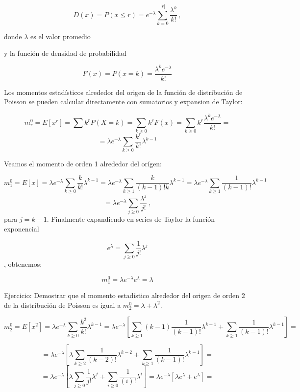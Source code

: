 \documentclass[
]{agujournal2019}
\begin{document}
\[D(x)=P(x \le r)=e^{-\lambda}\sum^{|r|}_{k=0}\frac{\lambda^k}{k!}\,,\]

donde \(\lambda\) es el valor promedio

\begin{center}
\end{center}

y la función de densidad de probabilidad

\[F(x)=P(x=k)=\frac{{\lambda}^k e^{-\lambda}}{k!}\]

\begin{center}
\end{center}

Los momentos estadísticos alrededor del origen de la función de
distribución de Poisson se pueden calcular directamente con sumatorios y
expansion de Taylor:

\[m^0_r=E[x^r]=\sum k^r P(X=k)=\sum_{k\ge0} k^rF(x)= \sum_{k\ge0} k^r\frac{{\lambda}^k e^{-\lambda}}{k!}=\]
\[=\lambda e^{-\lambda}\sum_{k \ge 0}\frac{k^r}{k!}\lambda^{k-1}\]

Veamos el momento de orden 1 alrededor del orígen:

\[m^0_1=E[x]=\lambda e^{-\lambda}\sum_{k \ge 0}\frac{k}{k!}\lambda^{k-1}=
 \lambda e^{-\lambda}\sum_{k \ge 1}\frac{k}{(k-1)!k}\lambda^{k-1}=
 \lambda e^{-\lambda}\sum_{k \ge 1}\frac{1}{(k-1)!}\lambda^{k-1}\]
\[=\lambda e^{-\lambda}\sum_{j \ge 0}\frac{\lambda^{j}}{j!}\,,\] para
\(j=k-1\). Finalmente expandiendo en series de Taylor la función
exponencial

\[e^{\lambda}=\sum_{j \ge 0}\frac{1}{j!}\lambda^{j}\], obtenemos:

\[m^0_1=\lambda e^{-\lambda}e^{\lambda}=\lambda\]

Ejercicio: Demostrar que el momento estadístico alrededor del origen de
orden 2 de la distribución de Poisson es igual a
\(m^0_2=\lambda+\lambda^2\).

\[m^0_2=E[x^2]=\lambda e^{-\lambda}\sum_{k \ge 0}\frac{k^2}{k!}\lambda^{k-1}=
               \lambda e^{-\lambda}\left[ \sum_{k \ge 1}(k-1)\frac{1}{(k-1)!}\lambda^{k-1} +
                                      \sum_{k \ge 1} \frac{1} {(k-1)!} \lambda^{k-1} \right]=\]

\[= \lambda e^{-\lambda}\left[ \lambda \sum_{k \ge 2}\frac{1}{(k-2)!}\lambda^{k-2} + \sum_{k \ge 1}\frac{1}{(k-1)!}\lambda^{k-1}\right]=\]
\[= \lambda e^{-\lambda}\left[ \lambda \sum_{j \ge 0}\frac{1}{j!}\lambda^{j} + \sum_{i \ge 0}\frac{1}{(i)!}\lambda^{i}\right]=
\lambda e^{-\lambda} \left[\lambda e^{\lambda} + e^{\lambda}\right]=\]
\end{document}
